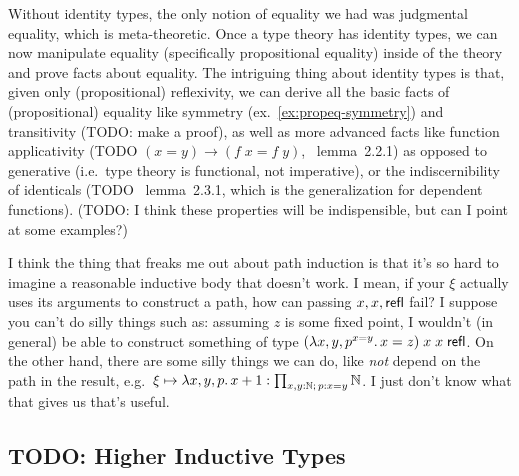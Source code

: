 \documentclass[11pt]{article} %
\theoremstyle{definition}
\theoremstyle{remark}
\begin{document}
Without identity types, the only notion of equality we had was judgmental equality, which is meta-theoretic.
Once a type theory has identity types, we can now manipulate equality (specifically propositional equality) inside of the theory and prove facts about equality.
The intriguing thing about identity types is that, given only (propositional) reflexivity, we can derive all the basic facts of (propositional) equality like symmetry (ex.~\ref{ex:propeq-symmetry}) and transitivity (TODO: make a proof), as well as more advanced facts like function applicativity (TODO $(x = y) \to (f\;x = f\;y)$, \cite{hottbook}~lemma~2.2.1) as opposed to generative (i.e.\ type theory is functional, not imperative), or the indiscernibility of identicals (TODO \cite{hottbook}~lemma~2.3.1, which is the generalization for dependent functions).
(TODO: I think these properties will be indispensible, but can I point at some examples?)


I think the thing that freaks me out about path induction is that it's so hard to imagine a reasonable inductive body that doesn't work.
I mean, if your $\xi$ actually uses its arguments to construct a path, how can passing $x, x, \mathsf{refl}$ fail?
I suppose you can't do silly things such as: assuming $z$ is some fixed point, I wouldn't (in general) be able to construct something of type $({\lambda}{x,y,p^{x=y}}.\,x=z)\;x\;x\;\mathsf{refl}$.
On the other hand, there are some silly things we can do, like \emph{not} depend on the path in the result, e.g.\ $\xi \mapsto \fun{x,y,p} x + 1 : \Pitypes{x,y : \mathbb N;\, p : x=y}\mathbb N$.
I just don't know what that gives us that's useful.










\subsection{TODO: Higher Inductive Types}\label{subsec:HIT}
\end{document}
